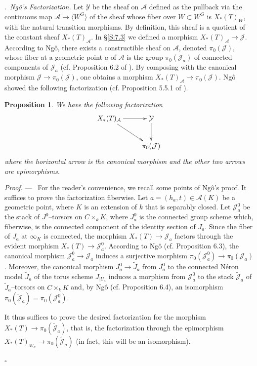 \documentclass[12pt,a4paper,oneside,english,leqno]{smfart}
\makeatletter
\numberwithin{equation}{subsection}
\newcounter{theo}
\numberwithin{theo}{subsection}
\newenvironment{paragr}[1][]{\medskip\refstepcounter{subsection}%
  \par\noindent\hspace*{\parindent}\thesubsection.\ \emph{#1}%
  \@ifundefined{@empty}{}{}\ignorespaces}{\medskip}
\theoremstyle{plain}
\newtheorem{proposition}[theo]{Proposition}
\theoremstyle{definition}
\theoremstyle{remark}
\newenvironment{preuve}[1][]{\medskip\noindent\textit{Proof.} #1 ---\ }%
  {\hfill\ensuremath{\square}\medskip}
\newcommand{\yc}{\mathcal{Y}}
\newcommand{\Ac}{\mathcal{A}}
\newcommand{\Jc}{\mathcal{J}}
\newcommand{\bg}{\langle}
\newcommand{\bd}{\rangle}
\makeatother
\begin{document}
\begin{paragr}[Ng\^o's Factorization.]\label{S:7.5} Let $\mathcal{Y}$ be the sheaf on $\Ac$ defined as the pullback via the continuous map $\Ac\rightarrow \bg W^G \bd$ of the sheaf whose fiber over $W\subset W^G$ is $X_{*}(T)_{W}$, with the natural transition morphisms. By definition, this sheaf is a quotient of the constant sheaf $X_{*}(T)_{\Ac}$. In §\ref{S:7.3} we defined a morphism $X_{*}(T)_{\Ac} \to \Jc$. According to Ng\^o, there exists a constructible sheaf on $\Ac$, denoted $\pi_0(\Jc)$, whose fiber at a geometric point $a$ of $\Ac$ is the group $\pi_0(\Jc_a)$ of connected components of $\Jc_a$ (cf. Proposition 6.2 of \cite{Ngo-endoscopie}). By composing with the canonical morphism $\Jc\to \pi_0(\Jc)$, one obtains a morphism $X_{*}(T)_{\Ac}\to \pi_0(\Jc)$. Ng\^o showed the following factorization (cf. Proposition 5.5.1 of \cite{Ngo-lemme}).

\begin{proposition}\label{thm:7.5.1}
We have the following factorization
$$\xymatrix{
   X_{*}(T)_{\Ac}  \ar[r] \ar[rd] & \yc \ar[d]\\
& \pi_0(\Jc)
}$$
where the horizontal arrow is the canonical morphism and the other two arrows are epimorphisms.
\end{proposition}

\begin{preuve}
For the reader’s convenience, we recall some points of Ng\^o's proof. It suffices to prove the factorization fiberwise. Let $a=(h_a,t)\in \Ac(K)$ be a geometric point, where $K$ is an extension of $k$ that is separably closed. Let $\Jc^0_a$ be the stack of $J^0$–torsors on $C\times_k K$, where $J^0_a$ is the connected group scheme which, fiberwise, is the connected component of the identity section of $J_a$. Since the fiber of $J_a$ at $\infty_K$ is connected, the morphism $X_*(T)\to \Jc_a$ factors through the evident morphism $X_*(T)\to \Jc^0_a$. According to Ng\^o (cf. \cite{Ngo-endoscopie} Proposition 6.3), the canonical morphism $\Jc^0_a \to \Jc_a$ induces a surjective morphism $\pi_0(\Jc^0_a) \to \pi_0(\Jc_a)$. Moreover, the canonical morphism $J^0_a \to \tilde{J}_a$ from $J^0_a$ to the connected Néron model $\tilde{J}_a$ of the torus scheme $J_{|U_a}$ induces a morphism from $\Jc^0_a$ to the stack $\tilde{\Jc}_a$ of $\tilde{J}_a$–torsors on $C\times_k K$ and, by Ng\^o (cf. \cite{Ngo-endoscopie} Proposition 6.4), an isomorphism $\pi_0(\tilde{\Jc}_a)=\pi_0(\Jc^0_a)$.

It thus suffices to prove the desired factorization for the morphism $X_*(T)\to \pi_0(\tilde{\Jc}_a)$, that is, the factorization through the epimorphism $X_*(T)_{W_a}\to \pi_0(\tilde{\Jc}_a)$ (in fact, this will be an isomorphism).


\end{preuve}
\end{paragr}
\end{document}
